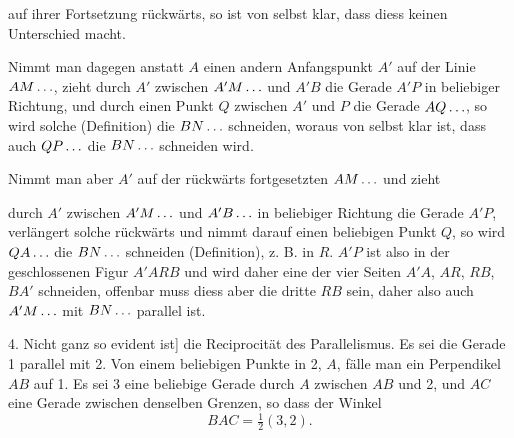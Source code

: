 auf ihrer Fortsetzung rückwärts, so ist von selbst klar, dass diess keinen Unterschied macht.

Nimmt man dagegen anstatt $A$ einen andern
Anfangspunkt $A'$ auf der Linie $AM\mathinner{.\,.\,.}$,
zieht durch $A'$ zwischen $A'M\mathinner{.\,.\,.}$ und $A'B$
die Gerade $A'P$ in beliebiger Richtung, und
durch einen Punkt $Q$ zwischen $A'$ und $P$
die Gerade $AQ\mathinner{.\,.\,.}$, so wird solche (Definition)
die $BN\mathinner{.\,.\,.}$ schneiden, woraus von selbst klar
ist, dass auch $QP\mathinner{.\,.\,.}$ die $BN\mathinner{.\,.\,.}$ schneiden
wird.

\begin{center}

\end{center}

Nimmt man aber $A'$ auf der rückwärts fortgesetzten $AM\mathinner{.\,.\,.}$ und zieht

\begin{center}

\end{center}
\noindent durch $A'$ zwischen $A'M\mathinner{.\,.\,.}$ und $A'B\mathinner{.\,.\,.}$ in beliebiger Richtung die Gerade $A'P$,
verlängert solche rückwärts und nimmt darauf einen beliebigen Punkt $Q$, so
wird $QA\mathinner{.\,.\,.}$ die $BN\mathinner{.\,.\,.}$ schneiden (Definition), z. B. in $R$. $A'P$ ist also in der
geschlossenen Figur $A'ARB$ und wird daher eine der vier Seiten $A'A$, $AR$,
$RB$, $BA'$ schneiden, offenbar muss diess aber die dritte $RB$ sein, daher also
auch $A'M\mathinner{.\,.\,.}$ mit $BN\mathinner{.\,.\,.}$ parallel ist.

4. Nicht ganz so evident ist] die Reciprocität des Parallelismus. Es sei
die Gerade 1 parallel mit 2. Von einem beliebigen Punkte in 2, $A$, fälle
man ein Perpendikel $AB$ auf 1. Es sei 3 eine beliebige Gerade durch $A$
zwischen $AB$ und 2, und $AC$ eine Gerade zwischen denselben Grenzen, so
dass der Winkel
\[
BAC = \tfrac{1}{2}(3,2).
\]

